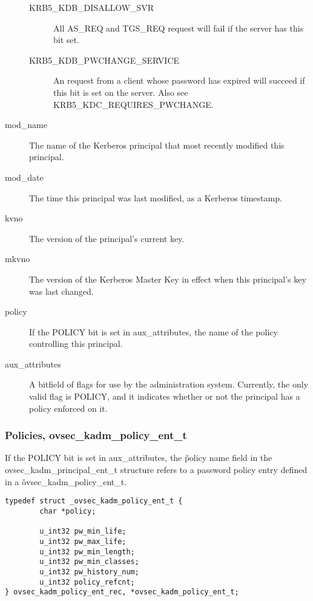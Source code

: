 \begin{description}
\begin{description}
\item[KRB5_KDB_DISALLOW_SVR] All AS_REQ and TGS_REQ request will fail
if the server has this bit set.

\item[KRB5_KDB_PWCHANGE_SERVICE] An request from a client whose
password has expired will succeed if this bit is set on the server.
Also see KRB5_KDC_REQUIRES_PWCHANGE.
\end{description}

\item[mod_name] The name of the Kerberos principal that most recently
modified this principal.

\item[mod_date] The time this principal was last modified, as a Kerberos
timestamp.

\item[kvno] The version of the principal's current key.

\item[mkvno] The version of the Kerberos Master Key in effect when
this principal's key was last changed.

\item[policy] If the POLICY bit is set in aux_attributes, the name
of the policy controlling this principal.

\item[aux_attributes]  A bitfield of flags for use by the
administration system.  Currently, the only valid flag is POLICY, and
it indicates whether or not the principal has a policy enforced on it.
\end{description}

\subsubsection{Policies, ovsec_kadm_policy_ent_t}
\label{sec:policy-fields}

If the POLICY bit is set in aux_attributes, the \v{policy} name field
in the ovsec_kadm_principal_ent_t structure refers to a password
policy entry defined in a \v{ovsec_kadm_policy_ent_t}.

\begin{verbatim}
typedef struct _ovsec_kadm_policy_ent_t {
        char *policy;

        u_int32 pw_min_life;
        u_int32 pw_max_life;
        u_int32 pw_min_length;
        u_int32 pw_min_classes;
        u_int32 pw_history_num;
        u_int32 policy_refcnt;
} ovsec_kadm_policy_ent_rec, *ovsec_kadm_policy_ent_t;
\end{verbatim}

